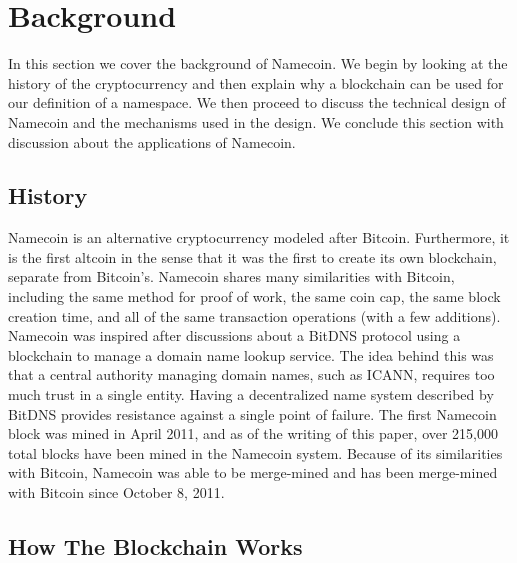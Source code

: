 \section{Background}
\label{sec:background}

In this section we cover the background of Namecoin. We begin by looking at the history of the cryptocurrency and then explain why a blockchain can be used for our definition of a namespace. We then proceed to discuss the technical design of Namecoin and the mechanisms used in the design. We conclude this section with discussion about the applications of Namecoin.

\subsection{History}

Namecoin is an alternative cryptocurrency modeled after Bitcoin\cite{nakamoto2008bitcoin}. Furthermore, it is the first altcoin in the sense that it was the first to create its own blockchain, separate from Bitcoin's.  Namecoin shares many similarities with Bitcoin, including the same method for proof of work, the same coin cap, the same block creation time, and all of the same transaction operations (with a few additions). Namecoin was inspired after discussions about a BitDNS\cite{bitdns} protocol using a blockchain to manage a domain name lookup service. The idea behind this was that a central authority managing domain names, such as ICANN, requires too much trust in a single entity. Having a decentralized name system described by BitDNS provides resistance against a single point of failure. The first Namecoin block was mined in April 2011, and as of the writing of this paper, over 215,000 total blocks have been mined in the Namecoin system. Because of its similarities with Bitcoin, Namecoin was able to be merge-mined and has been merge-mined with Bitcoin since October 8, 2011. 

\subsection{How The Blockchain Works}


